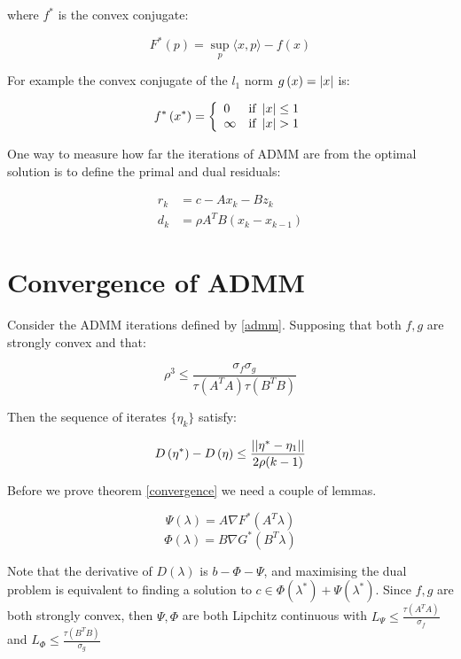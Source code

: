 \documentclass{article}
\begin{document}
where \(f^*\) is the convex conjugate:

\begin{equation}
F^*\left(p\right) = \sup_p \langle x,p \rangle - f\left(x\right)
\end{equation}

For example the convex conjugate of the \(l_1\) norm \( g\left(x\right) = \left|x\right| \) is:

\begin{equation}
f^*\left(x^*\right) =  \left\{ \begin{array}{ll}  0  & \mbox{if } \left|x\right| \leq 1 \\ \infty & \mbox{if } \left|x\right| > 1 \end{array} \right.
\end{equation}

One way to measure how far the iterations of ADMM are from the optimal solution is to define the primal and dual residuals:

\begin{align}
r_k &= c - Ax_k - Bz_k \\
d_k &= \rho A^T B \left(x_k - x_{k-1}\right)
\end{align}

\section{Convergence of ADMM}

\begin{theorem}
Consider the ADMM iterations defined by \eqref{admm}. Supposing that both \(f,g\) are strongly convex and that:

\begin{equation}
\rho^3 \leq \frac{\sigma_f \sigma_g }{\tau\left(A^TA\right)\tau\left(B^TB\right)}
\end{equation}

Then the sequence of iterates \(\{\eta_k\}\) satisfy:

\begin{equation}
D\left(\eta^*\right) - D\left(\eta\right) \leq \frac{\left|\left|\eta^* - \eta_1\right|\right|}{2\rho(k-1)}
\end{equation}
\label{convergence}
\end{theorem}

Before we prove theorem \ref{convergence} we need a couple of lemmas.

\begin{definition}
$$\Psi\left(\lambda\right) = A \nabla F^*\left(A^T\lambda\right)$$
$$\Phi\left(\lambda\right) = B\nabla G^*\left(B^T\lambda\right)$$
\end{definition}

Note that the derivative of \( D\left(\lambda \right) \) is \(b - \Phi - \Psi \), and maximising the dual problem is equivalent to finding a solution to \( c \in \Phi\left(\lambda^*\right) + \Psi\left(\lambda^*\right) \). Since \(f,g\) are both strongly convex, then \(\Psi, \Phi\) are both Lipchitz continuous with \(L_{\Psi} \leq \frac{\tau(A^TA)}{\sigma_f}\) and \(L_{\Phi} \leq \frac{\tau(B^TB)}{\sigma_g}\) 
\end{document}
